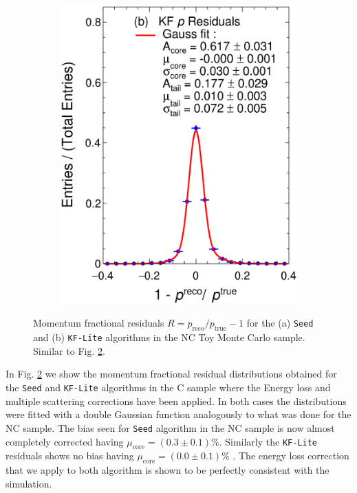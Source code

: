 \begin{figure}[t]
\begin{subfigure}[b]{0.48\textwidth}
         \includegraphics[width=\textwidth]{figures/ch4-KF_NDGArLite/Toy/Corr/pResKF_doublegauss.eps}
         \caption{}
         \label{fig:ToyResP_GArLite_Corr_KF}
     \end{subfigure}
        \caption[Momentum fractional residuals for the (a) \texttt{Seed} and (b) \texttt{KF-Lite} algorithms in the NC Toy Monte Carlo sample.]{Momentum fractional residuals $R=p_{\text{reco}}/p_{\text{true}} - 1$ for the (a) \texttt{Seed} and (b) \texttt{KF-Lite} algorithms in the NC Toy Monte Carlo sample. Similar to Fig. \ref{fig:ToyResP_GArLite_Corr}.} \label{fig:ToyResP_GArLite_Corr}
\end{figure}

In Fig. \ref{fig:ToyResP_GArLite_Corr} we show the momentum fractional residual distributions obtained for the \texttt{Seed} and \texttt{KF-Lite} algorithms in the C sample where the Energy loss and multiple scattering corrections have been applied. In both cases the distributions were fitted with a double Gaussian function analogously to what was done for the NC sample. The bias seen for \texttt{Seed} algorithm in the NC sample is now almost completely corrected having $\mu_\text{core}=(0.3\pm0.1)\%$. Similarly the \texttt{KF-Lite} residuals shows no bias having  $\mu_\text{core}=(0.0\pm 0.1)\%$ . The energy loss correction that we apply to both algorithm is shown to be perfectly consistent with the simulation.

